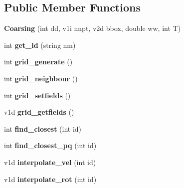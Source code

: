 \subsection*{Public Member Functions}
\begin{DoxyCompactItemize}
\item 
\mbox{\label{classCoarsing_a11132c6d00ff7325439fbf22f0123f14}} 
{\bfseries Coarsing} (int dd, v1i nnpt, v2d bbox, double ww, int T)
\item 
\mbox{\label{classCoarsing_a55274243000bb927b512fd2d74d19cb9}} 
int {\bfseries get\+\_\+id} (string nm)
\item 
\mbox{\label{classCoarsing_a8ea9edcad1f8b08efa58bff025d5632d}} 
int {\bfseries grid\+\_\+generate} ()
\item 
\mbox{\label{classCoarsing_ab6a0de9ae7a9d780cd1e8496e6dead3e}} 
int {\bfseries grid\+\_\+neighbour} ()
\item 
\mbox{\label{classCoarsing_a9d8a9b0c9393ffa0e28e30a7baf47e8f}} 
int {\bfseries grid\+\_\+setfields} ()
\item 
\mbox{\label{classCoarsing_a1e90778213173410a73cda8d0335ad04}} 
v1d {\bfseries grid\+\_\+getfields} ()
\item 
\mbox{\label{classCoarsing_ad9e3c512dd13cd0448c4269d1a4ee371}} 
int {\bfseries find\+\_\+closest} (int id)
\item 
\mbox{\label{classCoarsing_a4d71faafcbf3955a2c1ea105f940c17a}} 
int {\bfseries find\+\_\+closest\+\_\+pq} (int id)
\item 
\mbox{\label{classCoarsing_aa280ef8c110e4a95f21e001cac5af882}} 
v1d {\bfseries interpolate\+\_\+vel} (int id)
\item 
\mbox{\label{classCoarsing_a6b31e948d1213f1a8f31b9d85d75d65c}} 
v1d {\bfseries interpolate\+\_\+rot} (int id)
\item 
\mbox{\label{classCoarsing_ae61c76b2253b2e9b68878e722b7df6df}} 

\end{DoxyCompactItemize}
